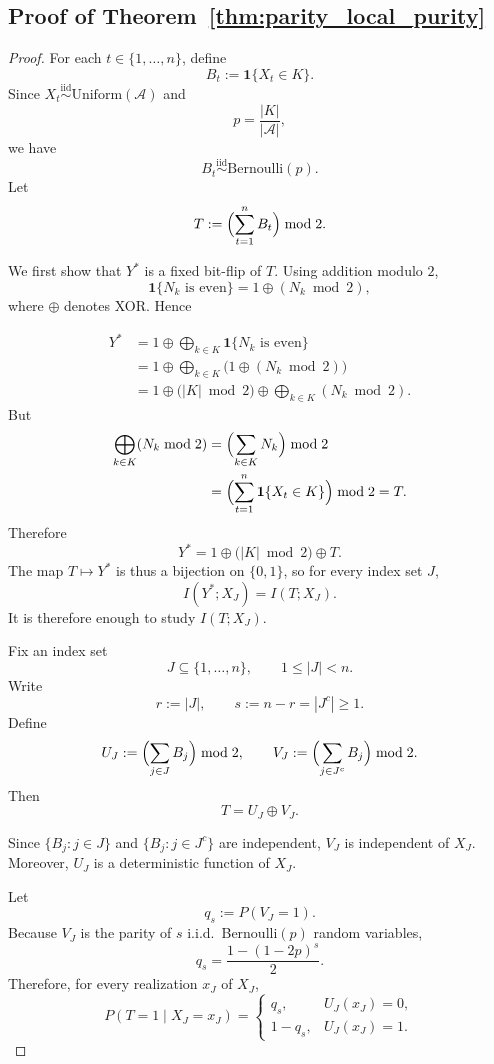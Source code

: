 \documentclass{article} %
\theoremstyle{plain}
\theoremstyle{definition}
\theoremstyle{remark}
\begin{document}
\subsection{Proof of Theorem~\ref{thm:parity_local_purity}}
\label{appendix:proof_parity_local_purity}

\begin{proof}
For each \(t\in\{1,\ldots,n\}\), define
\[
B_t := \mathbf{1}\{X_t\in K\}.
\]
Since \(X_t \overset{\mathrm{iid}}{\sim} \mathrm{Uniform}(\mathcal A)\) and
\[
p = \frac{|K|}{|\mathcal A|},
\]
we have
\[
B_t \overset{\mathrm{iid}}{\sim} \mathrm{Bernoulli}(p).
\]
Let
\[
T := \Bigl(\sum_{t=1}^n B_t\Bigr)\bmod 2.
\]

We first show that \(Y^*\) is a fixed bit-flip of \(T\). Using addition modulo \(2\),
\[
\mathbf{1}\{N_k \text{ is even}\} = 1 \oplus (N_k \bmod 2),
\]
where \(\oplus\) denotes XOR. Hence

\begin{align*}
Y^*
&=
1 \oplus\bigoplus_{k\in K} \mathbf{1}\{N_k \text{ is even}\} \\
&=
1 \oplus\bigoplus_{k\in K} \bigl(1 \oplus (N_k \bmod 2)\bigr) \\
&=
1 \oplus\bigl(|K|\bmod 2\bigr)\oplus \bigoplus_{k\in K}(N_k \bmod 2).
\end{align*}
But
\[
\begin{aligned}
\bigoplus_{k\in K}(N_k \bmod 2)
&=
\Bigl(\sum_{k\in K} N_k\Bigr)\bmod 2\\
&=
\Bigl(\sum_{t=1}^n \mathbf{1}\{X_t\in K\}\Bigr)\bmod 2
=
T.
\end{aligned}
\]
Therefore
\[
Y^* = 1 \oplus\bigl(|K|\bmod 2\bigr)\oplus T.
\]
The map \(T\mapsto Y^*\) is thus a bijection on \(\{0,1\}\), so for every index set \(J\),
\[
I(Y^*;X_J)=I(T;X_J).
\]
It is therefore enough to study \(I(T;X_J)\).

Fix an index set
\[
J\subseteq \{1,\ldots,n\},
\qquad 1\le |J|<n.
\]
Write
\[
r := |J|,
\qquad
s := n-r = |J^c| \ge 1.
\]
Define
\[
U_J := \Bigl(\sum_{j\in J} B_j\Bigr)\bmod 2,
\qquad
V_J := \Bigl(\sum_{j\in J^c} B_j\Bigr)\bmod 2.
\]
Then
\[
T = U_J \oplus V_J.
\]

Since \(\{B_j : j\in J\}\) and \(\{B_j : j\in J^c\}\) are independent,
\(V_J\) is independent of \(X_J\). Moreover, \(U_J\) is a deterministic function of
\(X_J\).

Let
\[
q_s := P(V_J=1).
\]
Because \(V_J\) is the parity of \(s\) i.i.d.\ Bernoulli\((p)\) random variables,
\[
q_s = \frac{1-(1-2p)^s}{2}.
\]
Therefore, for every realization \(x_J\) of \(X_J\),
\[
P(T=1\mid X_J=x_J)
=
\begin{cases}
q_s, & U_J(x_J)=0,\\
1-q_s, & U_J(x_J)=1.
\end{cases}
\]


\end{proof}
\end{document}
